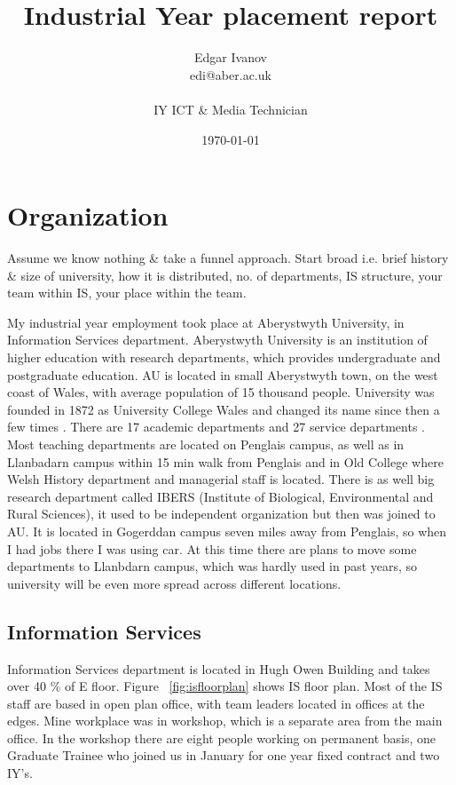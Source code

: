 \documentclass[10pt,a4paper,headinclude=true]{report}
\begin{document}
\onehalfspacing
\title{Industrial Year placement report}
\author{Edgar Ivanov\\ edi@aber.ac.uk \\ \\ IY ICT \& Media Technician}
\date{\today}

\maketitle
\tableofcontents

\chapter{Organization}
Assume we know nothing \& take a funnel approach. Start broad i.e. brief history \&
size of university, how it is distributed, no. of departments, IS structure, your
team within IS, your place within the team.

My industrial year employment took place at Aberystwyth University, in Information Services department. Aberystwyth University is an institution of higher education with research departments, which provides undergraduate and postgraduate education. AU is located in small Aberystwyth town, on the west coast of Wales, with average population of 15 thousand people. University was founded in 1872 as University College Wales and changed its name since then a few times \cite{History}.
There are 17 academic departments and 27 service departments \cite{Departments} \cite{Departments2}. Most teaching departments are located on Penglais campus, as well as in Llanbadarn campus within 15 min walk from Penglais and in Old College where Welsh History department and managerial staff is located. There is as well big research department called IBERS (Institute of Biological, Environmental and Rural Sciences), it used to be independent organization but then was joined to AU. It is located in Gogerddan campus seven miles away from Penglais, so when I had jobs there I was using car. At this time there are plans to move some departments to Llanbdarn campus, which was hardly used in past years, so university will be even more spread across different locations.

\section{Information Services}
Information Services department is located in Hugh Owen Building and takes over 40 \% of E floor. Figure ~\ref{fig:isfloorplan} shows IS floor plan. Most of the IS staff are based in open plan office, with team leaders located in offices at the edges. Mine workplace was in workshop, which is a separate area from the main office. In the workshop there are eight people working on permanent basis, one Graduate Trainee who joined us in January for one year fixed contract and two IY's.
\end{document}
